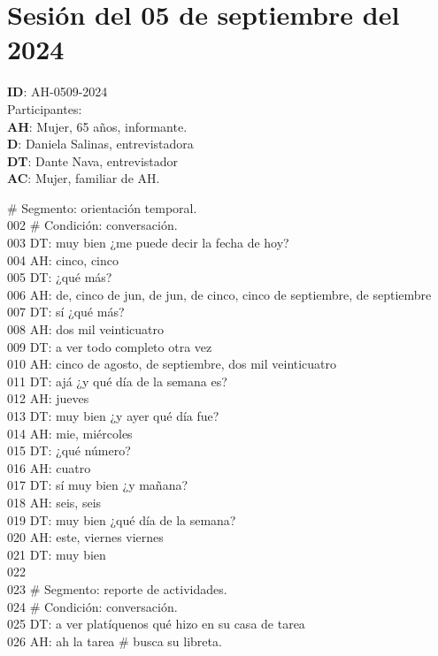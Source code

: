 \section{Sesión del 05 de septiembre del 2024}
\noindent
\textbf{ID}: AH-0509-2024\\
Participantes:\\
\textbf{AH}: Mujer, 65 años, informante.\\
\textbf{D}: Daniela Salinas, entrevistadora\\
\textbf{DT}: Dante Nava, entrevistador\\
\textbf{AC}: Mujer, familiar de AH.

 \# Segmento: orientación temporal.\\
002 \# Condición: conversación.\\
003 DT: muy bien ¿me puede decir la fecha de hoy?\\
004 AH: cinco, cinco\\
005 DT: ¿qué más?\\
006 AH:  de, cinco de jun, de jun, de cinco, cinco de septiembre, de septiembre\\
007 DT: sí ¿qué más?\\
008 AH: dos mil veinticuatro\\
009 DT: a ver todo completo otra vez\\
010 AH: cinco de agosto, de septiembre, dos mil veinticuatro\\
011 DT: ajá ¿y qué día de la semana es?\\
012 AH: jueves\\
013 DT: muy bien ¿y ayer qué día fue?\\
014 AH: mie, miércoles\\
015 DT: ¿qué número?\\
016 AH: cuatro\\
017 DT: sí muy bien ¿y mañana?\\
018 AH: seis, seis\\
019 DT: muy bien ¿qué día de la semana?\\
020 AH: este, viernes viernes\\
021 DT: muy bien\\
022 \\
023 \# Segmento: reporte de actividades.\\
024 \# Condición: conversación.\\
025 DT: a ver platíquenos qué hizo en su casa de tarea\\
026 AH: ah la tarea \# busca su libreta.\\
